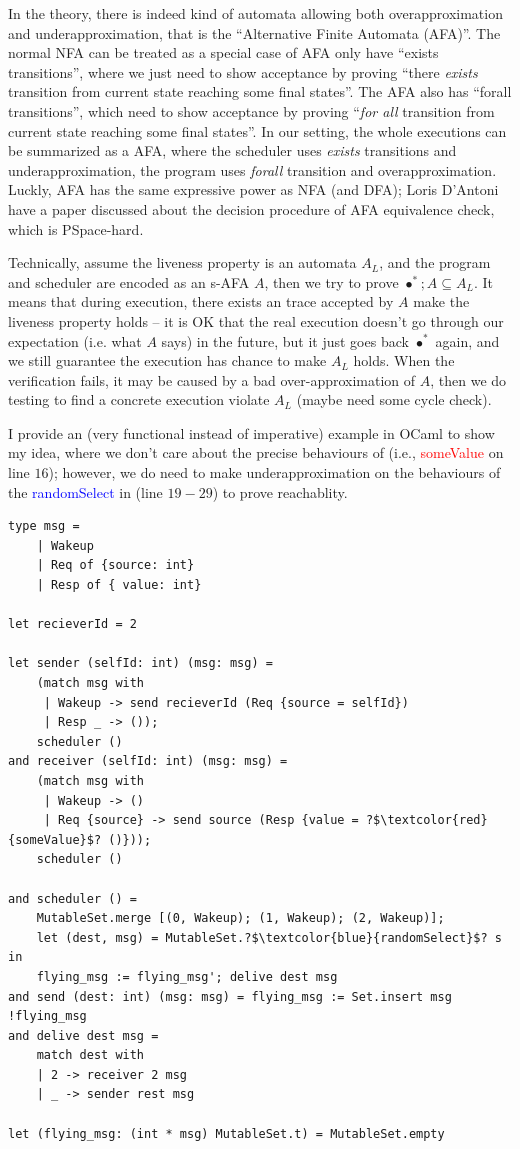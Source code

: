 In the theory, there is indeed kind of automata allowing both overapproximation and underapproximation, that is the ``Alternative Finite Automata (AFA)''. The normal NFA can be treated as a special case of AFA only have ``exists transitions'', where we just need to show acceptance by proving ``there \emph{exists} transition from current state reaching some final states''. The AFA also has ``forall transitions'', which need to show acceptance by proving ``\emph{for all} transition from current state reaching some final states''. In our setting, the whole executions can be summarized as a AFA, where the scheduler uses \emph{exists} transitions and underapproximation, the program uses \emph{forall} transition and overapproximation. Luckly, AFA has the same expressive power as NFA (and DFA); Loris D’Antoni have a paper discussed about the decision procedure of AFA equivalence check, which is PSpace-hard.

Technically, assume the liveness property is an automata $A_{L}$, and the program and scheduler are encoded as an s-AFA $A$, then we try to prove $\bullet^*;A \subseteq A_{L}$. It means that during execution, there exists an trace accepted by $A$ make the liveness property holds -- it is OK that the real execution doesn't go through our expectation (i.e. what $A$ says) in the future, but it just goes back $\bullet^*$ again, and we still guarantee the execution has chance to make $A_{L}$ holds. When the verification fails, it may be caused by a bad over-approximation of $A$, then we do testing to find a concrete execution violate $A_{L}$ (maybe need some cycle check).

I provide an (very functional instead of imperative) example in OCaml to show my idea, where we don't care about the precise behaviours of  (i.e., \textcolor{red}{someValue} on line $16$); however, we do need to make underapproximation on the behaviours of the \textcolor{blue}{randomSelect} in  (line $19-29$) to prove reachablity.

\begin{verbatim}
type msg = 
    | Wakeup 
    | Req of {source: int} 
    | Resp of { value: int}

let recieverId = 2

let sender (selfId: int) (msg: msg) =
    (match msg with
     | Wakeup -> send recieverId (Req {source = selfId})
     | Resp _ -> ());
    scheduler ()
and receiver (selfId: int) (msg: msg) =
    (match msg with
     | Wakeup -> ()
     | Req {source} -> send source (Resp {value = ?$\textcolor{red}{someValue}$? ()}));
    scheduler ()

and scheduler () =
    MutableSet.merge [(0, Wakeup); (1, Wakeup); (2, Wakeup)];
    let (dest, msg) = MutableSet.?$\textcolor{blue}{randomSelect}$? s in
    flying_msg := flying_msg'; delive dest msg
and send (dest: int) (msg: msg) = flying_msg := Set.insert msg !flying_msg
and delive dest msg =
    match dest with
    | 2 -> receiver 2 msg
    | _ -> sender rest msg

let (flying_msg: (int * msg) MutableSet.t) = MutableSet.empty
\end{verbatim}

